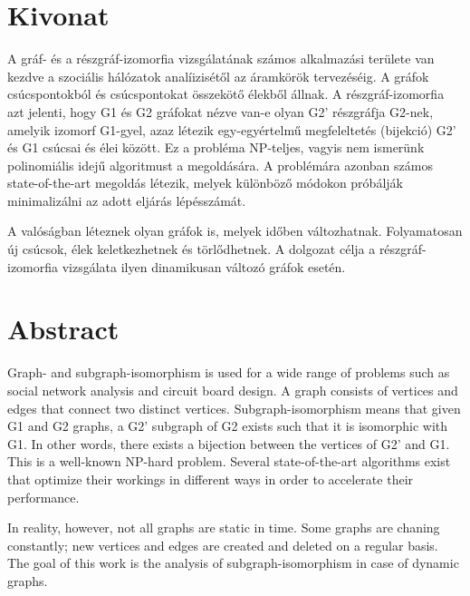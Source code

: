 \setcounter{page}{1}

\selecthungarian

\chapter*{Kivonat}

A gráf- és a részgráf-izomorfia vizsgálatának számos alkalmazási területe van kezdve a szociális hálózatok analíizisétől az áramkörök tervezéséig. A gráfok csúcspontokból és csúcspontokat összekötő élekből állnak. A részgráf-izomorfia azt jelenti, hogy G1 és G2 gráfokat nézve van-e olyan G2’ részgráfja G2-nek, amelyik izomorf G1-gyel, azaz létezik egy-egyértelmű megfeleltetés (bijekció) G2’ és G1 csúcsai és élei között. Ez a probléma NP-teljes, vagyis nem ismerünk polinomiális idejű algoritmust a megoldására. A problémára azonban számos state-of-the-art megoldás létezik, melyek különböző módokon próbálják minimalizálni az adott eljárás lépésszámát.

A valóságban léteznek olyan gráfok is, melyek időben változhatnak. Folyamatosan új csúcsok, élek keletkezhetnek és törlődhetnek. A dolgozat célja a részgráf-izomorfia vizsgálata ilyen dinamikusan változó gráfok esetén. 


\vfill
\selectenglish


\chapter*{Abstract}

Graph- and subgraph-isomorphism is used for a wide range of problems such as social network analysis and circuit board design. A graph consists of vertices and edges that connect two distinct vertices. Subgraph-isomorphism means that given G1 and G2 graphs, a G2' subgraph of G2 exists such that it is isomorphic with G1. In other words, there exists a bijection between the vertices of G2' and G1. This is a well-known NP-hard problem. Several state-of-the-art algorithms exist that optimize their workings in different ways in order to accelerate their performance.

In reality, however, not all graphs are static in time. Some graphs are chaning constantly; new vertices and edges are created and deleted on a regular basis. The goal of this work is the analysis of subgraph-isomorphism in case of dynamic graphs. 


\vfill
\cleardoublepage

\selectthesislanguage

\setcounter{romanPage}{\value{page}}

